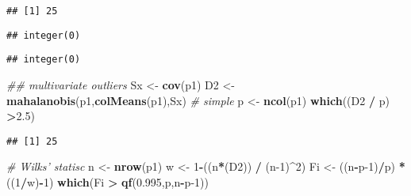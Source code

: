 \documentclass[]{article}
\newenvironment{Shaded}{\begin{snugshade}}{\end{snugshade}}
\newcommand{\CommentTok}[1]{\textcolor[rgb]{0.56,0.35,0.01}{\textit{#1}}}
\newcommand{\DecValTok}[1]{\textcolor[rgb]{0.00,0.00,0.81}{#1}}
\newcommand{\FloatTok}[1]{\textcolor[rgb]{0.00,0.00,0.81}{#1}}
\newcommand{\KeywordTok}[1]{\textcolor[rgb]{0.13,0.29,0.53}{\textbf{#1}}}
\newcommand{\NormalTok}[1]{#1}
\newcommand{\OperatorTok}[1]{\textcolor[rgb]{0.81,0.36,0.00}{\textbf{#1}}}
\newcommand{\StringTok}[1]{\textcolor[rgb]{0.31,0.60,0.02}{#1}}
\begin{document}
\begin{verbatim}
## [1] 25
\end{verbatim}

\begin{Shaded}
\end{Shaded}

\begin{verbatim}
## integer(0)
\end{verbatim}

\begin{Shaded}
\end{Shaded}

\begin{verbatim}
## integer(0)
\end{verbatim}

\begin{Shaded}
\begin{Highlighting}[]
\CommentTok{## multivariate outliers}
\NormalTok{Sx <-}\StringTok{ }\KeywordTok{cov}\NormalTok{(p1)}
\NormalTok{D2 <-}\StringTok{ }\KeywordTok{mahalanobis}\NormalTok{(p1,}\KeywordTok{colMeans}\NormalTok{(p1),Sx)}
\CommentTok{# simple}
\NormalTok{p <-}\StringTok{ }\KeywordTok{ncol}\NormalTok{(p1)}
\KeywordTok{which}\NormalTok{((D2 }\OperatorTok{/}\StringTok{ }\NormalTok{p) }\OperatorTok{>}\FloatTok{2.5}\NormalTok{)}
\end{Highlighting}
\end{Shaded}

\begin{verbatim}
## [1] 25
\end{verbatim}

\begin{Shaded}
\begin{Highlighting}[]
\CommentTok{# Wilks' statisc}
\NormalTok{n <-}\StringTok{ }\KeywordTok{nrow}\NormalTok{(p1)}
\NormalTok{w <-}\StringTok{ }\DecValTok{1}\OperatorTok{-}\NormalTok{((n}\OperatorTok{*}\NormalTok{(D2)) }\OperatorTok{/}\StringTok{ }\NormalTok{(n}\DecValTok{-1}\NormalTok{)}\OperatorTok{^}\DecValTok{2}\NormalTok{)}
\NormalTok{Fi <-}\StringTok{ }\NormalTok{((n}\OperatorTok{-}\NormalTok{p}\DecValTok{-1}\NormalTok{)}\OperatorTok{/}\NormalTok{p) }\OperatorTok{*}\StringTok{ }\NormalTok{((}\DecValTok{1}\OperatorTok{/}\NormalTok{w)}\OperatorTok{-}\DecValTok{1}\NormalTok{)}
\KeywordTok{which}\NormalTok{(Fi }\OperatorTok{>}\StringTok{ }\KeywordTok{qf}\NormalTok{(}\FloatTok{0.995}\NormalTok{,p,n}\OperatorTok{-}\NormalTok{p}\DecValTok{-1}\NormalTok{))}
\end{Highlighting}
\end{Shaded}
\end{document}

